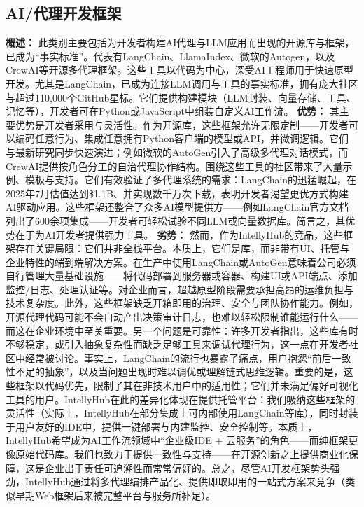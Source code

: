 \documentclass[11pt, a4paper, oneside]{article}
\begin{document}
\subsection{AI/代理开发框架}
\textbf{概述：} 此类别主要包括为开发者构建AI代理与LLM应用而出现的开源库与框架，已成为“事实标准”。代表有LangChain、LlamaIndex、微软的Autogen，以及CrewAI等开源多代理框架。这些工具以代码为中心，深受AI工程师用于快速原型开发。尤其是LangChain，已成为连接LLM调用与工具的事实标准，拥有庞大社区与超过110,000个GitHub星标\cite{langchainGitHub}。它们提供构建模块（LLM封装、向量存储、工具、记忆等），开发者可在Python或JavaScript中组装自定义AI工作流。
\newline\newline
\textbf{优势：} 其主要优势是开发者采用与灵活性。作为开源库，这些框架允许无限定制——开发者可以编码任意行为、集成任意拥有Python客户端的模型或API，并微调逻辑。它们与最新研究同步快速演进；例如微软的AutoGen引入了高级多代理对话模式\cite{autogenGitHub}，而CrewAI提供按角色分工的自治代理协作结构\cite{crewaiGitHub}。围绕这些工具的社区带来了大量示例、模板与支持。它们有效验证了多代理系统的需求：LangChain的迅猛崛起，在2025年7月估值达到\$1.1B\cite{langchainValuation}、并实现数千万次下载，表明开发者渴望更优方式构建AI驱动应用。这些框架还整合了众多AI模型提供方——例如LangChain官方文档列出了600余项集成\cite{langchainIntegrations}——开发者可轻松试验不同LLM或向量数据库。简言之，其优势在于为AI开发者提供强力工具。
\newline\newline
\textbf{劣势：} 然而，作为IntellyHub的竞品，这些框架存在关键局限：它们并非全栈平台。本质上，它们是库，而非带有UI、托管与企业特性的端到端解决方案。在生产中使用LangChain或AutoGen意味着公司必须自行管理大量基础设施——将代码部署到服务器或容器、构建UI或API端点、添加监控/日志、处理认证等。对企业而言，超越原型阶段需要承担高昂的运维负担与技术复杂度。此外，这些框架缺乏开箱即用的治理、安全与团队协作能力。例如，开源代理代码可能不会自动产出决策审计日志，也难以轻松限制谁能运行什么——而这在企业环境中至关重要。另一个问题是可靠性：许多开发者指出，这些库有时不够稳定，或引入抽象复杂性而缺乏足够工具来调试代理行为，这一点在开发者社区中经常被讨论\cite{langchainCritique}。事实上，LangChain的流行也暴露了痛点，用户抱怨“前后一致性不足的抽象”，以及当问题出现时难以调优或理解链式思维逻辑。重要的是，这些框架以代码优先，限制了其在非技术用户中的适用性；它们并未满足偏好可视化工具的用户。IntellyHub在此的差异化体现在提供托管平台：我们吸纳这些框架的灵活性（实际上，IntellyHub在部分集成上可内部使用LangChain等库），同时封装于用户友好的IDE中，提供一键部署与内建监控、安全控制等。本质上，IntellyHub希望成为AI工作流领域中“企业级IDE + 云服务”的角色——而纯框架更像原始代码库。我们也致力于提供一致性与支持——在开源创新之上提供商业化保障，这是企业出于责任可追溯性而常常偏好的。总之，尽管AI开发框架势头强劲，IntellyHub通过将多代理编排产品化、提供即取即用的一站式方案来竞争（类似早期Web框架后来被完整平台与服务所补足）。
\end{document}
